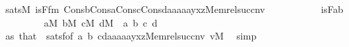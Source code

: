 \begin{isabellebody}
\ {\isachardoublequoteopen}sats{\isacharparenleft}{\kern0pt}M{\isacharcomma}{\kern0pt}\ is{\isacharunderscore}{\kern0pt}F{\isacharunderscore}{\kern0pt}fm{\isacharcomma}{\kern0pt}\ Cons{\isacharparenleft}{\kern0pt}b{\isacharcomma}{\kern0pt}Cons{\isacharparenleft}{\kern0pt}a{\isacharcomma}{\kern0pt}Cons{\isacharparenleft}{\kern0pt}c{\isacharcomma}{\kern0pt}Cons{\isacharparenleft}{\kern0pt}d{\isacharcomma}{\kern0pt}{\isacharbrackleft}{\kern0pt}a{}{\isacharcomma}{\kern0pt}a{}{\isacharcomma}{\kern0pt}a{}{\isacharcomma}{\kern0pt}a{}{\isacharcomma}{\kern0pt}a{}{\isacharcomma}{\kern0pt}y{\isacharcomma}{\kern0pt}x{\isacharcomma}{\kern0pt}z{\isacharcomma}{\kern0pt}Memrel{\isacharparenleft}{\kern0pt}succ{\isacharparenleft}{\kern0pt}n{\isacharparenright}{\kern0pt}{\isacharparenright}{\kern0pt}{\isacharcomma}{\kern0pt}v{\isacharbrackright}{\kern0pt}{\isacharparenright}{\kern0pt}{\isacharparenright}{\kern0pt}{\isacharparenright}{\kern0pt}{\isacharparenright}{\kern0pt}{\isacharparenright}{\kern0pt}\isanewline
\ \ \ \ \ \ \ \ \ \ {\isasymlongleftrightarrow}\ is{\isacharunderscore}{\kern0pt}F{\isacharparenleft}{\kern0pt}a{\isacharcomma}{\kern0pt}b{\isacharparenright}{\kern0pt}{\isachardoublequoteclose}\isanewline
\ \ \ \ \ \ \ \ \ {\isachardoublequoteopen}a{\isasymin}M{\isachardoublequoteclose}\ {\isachardoublequoteopen}b{\isasymin}M{\isachardoublequoteclose}\ {\isachardoublequoteopen}c{\isasymin}M{\isachardoublequoteclose}\ {\isachardoublequoteopen}d{\isasymin}M{\isachardoublequoteclose}\ \ a\ b\ c\ d\isanewline
\ \ \ \ \ \ \ \ \isamarkupfalse%
\ as\ that\ {}\ satsf{\isacharbrackleft}{\kern0pt}of\ a\ b\ {\isachardoublequoteopen}{\isacharbrackleft}{\kern0pt}c{\isacharcomma}{\kern0pt}d{\isacharcomma}{\kern0pt}a{}{\isacharcomma}{\kern0pt}a{}{\isacharcomma}{\kern0pt}a{}{\isacharcomma}{\kern0pt}a{}{\isacharcomma}{\kern0pt}a{}{\isacharcomma}{\kern0pt}y{\isacharcomma}{\kern0pt}x{\isacharcomma}{\kern0pt}z{\isacharcomma}{\kern0pt}Memrel{\isacharparenleft}{\kern0pt}succ{\isacharparenleft}{\kern0pt}n{\isacharparenright}{\kern0pt}{\isacharparenright}{\kern0pt}{\isacharcomma}{\kern0pt}v{\isacharbrackright}{\kern0pt}{\isachardoublequoteclose}{\isacharbrackright}{\kern0pt}\ {\isacartoucheopen}v{\isasymin}M{\isacartoucheclose}\ \isamarkupfalse%
\ simp\isanewline
\ \ \ \ \ \ \isamarkupfalse%
\isanewline
\ \ \ \ \ \ \isamarkupfalse%

\end{isabellebody}
